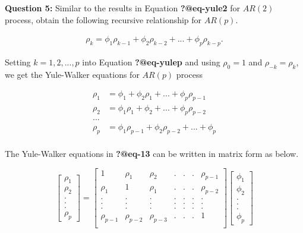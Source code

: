 \documentclass[
  11pt,
  a4paper,
]{report}
\begin{document}
\textbf{Question 5: } Similar to the results in Equation
\textbf{?@eq-yule2} for \(AR(2)\) process, obtain the following
recursive relationship for \(AR(p)\).

\begin{align}
\rho_k = \phi_1\rho_{k-1}+\phi_2 \rho_{k-2} + ... + \phi_p \rho_{k-p}.
\end{align}

Setting \(k=1, 2, ..., p\) into Equation \textbf{?@eq-yulep} and using
\(\rho_0=1\) and \(\rho_{-k}=\rho_k\), we get the Yule-Walker equations
for \(AR(p)\) process

\begin{equation}
\begin{aligned}
  \rho_1 &= \phi_1+\phi_2 \rho_{1} + ... + \phi_p \rho_{p-1}\\
  \rho_2 &= \phi_1 \rho_1+\phi_2  + ... + \phi_p \rho_{p-2}\\
  ... \\
  \rho_p &= \phi_1 \rho_{p-1} +\phi_2 \rho_{p-2}  + ... + \phi_p \\
\end{aligned}
\end{equation}

The Yule-Walker equations in \textbf{?@eq-13} can be written in matrix
form as below.

\[\left[\begin{array}
{r}
\rho_1  \\
\rho_2  \\
.\\
.\\
.\\
\rho_p
\end{array}\right] = \left[\begin{array}
{rrrrrrr}
1 & \rho_1 & \rho_2 & .&.&.& \rho_{p-1} \\
\rho_1 & 1 & \rho_1 & .&.&.& \rho_{p-2} \\
. & . & . & .&.&.& . \\
. & . & . & .&.&.& . \\
. & . & . & .&.&.& . \\
\rho_{p-1} & \rho_{p-2} & \rho_{p-3} & .&.&.& 1 \\
\end{array}\right] \left[\begin{array}
{r}
\phi_1  \\
\phi_2  \\
.\\
.\\
.\\
\phi_p
\end{array}\right]
\]
\end{document}
